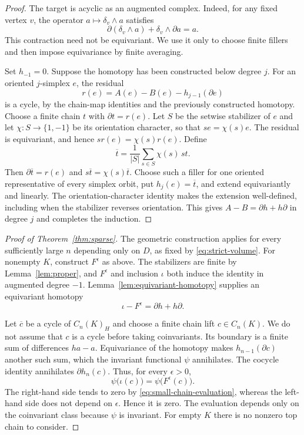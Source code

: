 \begin{proof}
The target is acyclic as an augmented complex. Indeed, for any
fixed vertex $v$, the operator $a\mapsto\delta_v\wedge a$ satisfies
\[
 \partial(\delta_v\wedge a)+\delta_v\wedge\partial a=a.
\]
This contraction need not be equivariant. We use it only to choose
finite fillers and then impose equivariance by finite averaging.

Set $h_{-1}=0$. Suppose the homotopy has been constructed below
degree $j$. For an oriented $j$-simplex $e$, the residual
\[
 r(e)=A(e)-B(e)-h_{j-1}(\partial e)
\]
is a cycle, by the chain-map identities and the previously
constructed homotopy. Choose a finite chain $t$ with
$\partial t=r(e)$. Let $S$ be the setwise stabilizer of $e$ and
let $\chi:S\to\{1,-1\}$ be its orientation character, so that
$s e=\chi(s)e$. The residual is equivariant, and hence
$s r(e)=\chi(s)r(e)$. Define
\[
 \overline t=\frac1{|S|}\sum_{s\in S}\chi(s)\,s t.
\]
Then $\partial\overline t=r(e)$ and
$s\overline t=\chi(s)\overline t$. Choose such a filler for one
oriented representative of every simplex orbit, put
$h_j(e)=\overline t$, and extend equivariantly and linearly.
The orientation-character identity makes the extension
well-defined, including when the stabilizer reverses orientation.
This gives $A-B=\partial h+h\partial$ in degree $j$ and completes
the induction.
\end{proof}

\begin{proof}[Proof of Theorem~\ref{thm:sparse}]
The geometric construction applies for every sufficiently large
$n$ depending only on $D$, as fixed by \eqref{eq:strict-volume}.
For nonempty $K$, construct $F^\epsilon$ as above. The stabilizers
are finite by Lemma~\ref{lem:proper}, and $F^\epsilon$ and inclusion
$\iota$ both induce the identity in augmented degree $-1$.
Lemma~\ref{lem:equivariant-homotopy} supplies an equivariant
homotopy
\[
 \iota-F^\epsilon=\partial h+h\partial.
\]

Let $\overline c$ be a cycle of $C_n(K)_H$ and choose a finite
chain lift $c\in C_n(K)$. We do not assume that $c$ is a cycle
before taking coinvariants. Its boundary is a finite sum of
differences $ha-a$. Equivariance of the homotopy makes
$h_{n-1}(\partial c)$ another such sum, which the invariant
functional $\psi$ annihilates. The cocycle identity annihilates
$\partial h_n(c)$. Thus, for every $\epsilon>0$,
\[
 \psi\bigl(\iota(c)\bigr)
 =\psi\bigl(F^\epsilon(c)\bigr).
\]
The right-hand side tends to zero by
\eqref{eq:small-chain-evaluation}, whereas the left-hand side
does not depend on $\epsilon$. Hence it is zero. The evaluation
depends only on the coinvariant class because $\psi$ is invariant.
For empty $K$ there is no nonzero top chain to consider.
\end{proof}
